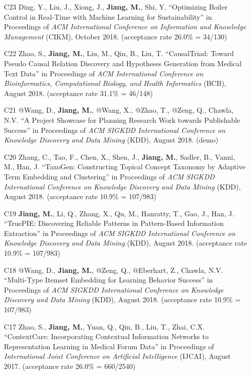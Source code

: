 \documentclass[10pt]{article}
\newenvironment{myindentpar}[1]%
{\begin{list}{}%
         {\setlength{\leftmargin}{#1}}%
         \item[]%
}
{\end{list}}
\newcounter{list}
\begin{document}
\begin{myindentpar}{0.00cm}
\begin{enumerate}[leftmargin=.5cm]
\item[C23] Ding, Y., Liu, J., Xiong, J., \textbf{Jiang, M.}, Shi, Y. ``Optimizing Boiler Control in Real-Time with Machine Learning for Sustainability'' in Proceedings of \textit{ACM International Conference on Information and Knowledge Management} (CIKM), October 2018. (acceptance rate 26.0\% = 34/130)

\item[C22] Zhao, S., \textbf{Jiang, M.}, Liu, M., Qin, B., Liu, T. ``CausalTriad: Toward Pseudo Causal Relation Discovery and Hypotheses Generation from Medical Text Data'' in Proceedings of \textit{ACM International Conference on Bioinformatics, Computational Biology, and Health Informatics} (BCB), August 2018. (acceptance rate 31.1\% = 46/148)

\item[C21] @Wang, D., \textbf{Jiang, M.}, @Wang, X., @Zhao, T., @Zeng, Q., Chawla, N.V. ``A Project Showcase for Planning Research Work towards Publishable Success'' in Proceedings of \textit{ACM SIGKDD International Conference on Knowledge Discovery and Data Mining} (KDD), August 2018. (demo)

\item[C20] Zhang, C., Tao, F., Chen, X., Shen, J., \textbf{Jiang, M.}, Sadler, B., Vanni, M., Han, J. ``TaxoGen: Constructing Topical Concept Taxonomy by Adaptive Term Embedding and Clustering'' in Proceedings of \textit{ACM SIGKDD International Conference on Knowledge Discovery and Data Mining} (KDD), August 2018. (acceptance rate 10.9\% = 107/983)

\item[C19] \textbf{Jiang, M.}, Li, Q., Zhang, X., Qu, M., Hanratty, T., Gao, J., Han, J. ``TruePIE: Discovering Reliable Patterns in Pattern-Based Information Extraction'' in Proceedings of \textit{ACM SIGKDD International Conference on Knowledge Discovery and Data Mining} (KDD), August 2018. (acceptance rate 10.9\% = 107/983)
	
\item[C18] @Wang, D., \textbf{Jiang, M.}, @Zeng, Q., @Eberhart, Z., Chawla, N.V. ``Multi-Type Itemset Embedding for Learning Behavior Success'' in Proceedings of \textit{ACM SIGKDD International Conference on Knowledge Discovery and Data Mining} (KDD), August 2018. (acceptance rate 10.9\% = 107/983)

\item[C17] Zhao, S., \textbf{Jiang, M.}, Yuan, Q., Qin, B., Liu, T., Zhai, C.X. ``ContextCare: Incorporating Contextual Information Networks to Representation Learning in Medical Forum Data'' in Proceedings of \textit{International Joint Conference on Artificial Intelligence} (IJCAI), August 2017. (acceptance rate 26.0\% = 660/2540)


\end{enumerate}
\end{myindentpar}
\end{document}
